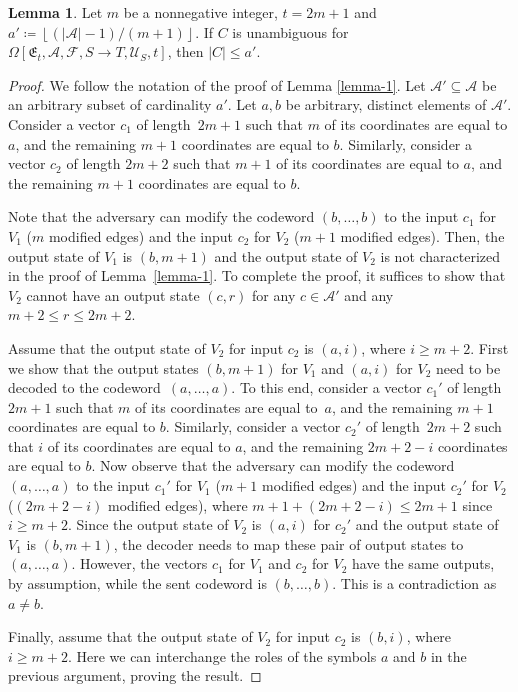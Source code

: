 \documentclass[11pt,a4paper]{article}
\theoremstyle{definition}
\newtheorem{lemma}[theorem]{Lemma}
\newcommand{\mA}{\mathcal{A}}
\newcommand{\mF}{\mathcal{F}}
\newcommand{\mU}{\mathcal{U}}
\begin{document}
\begin{lemma}
  \label{lemma0}
Let $m$ be a nonnegative integer, $t=2m+1$ and $a'\coloneqq\left\lfloor (|\mathcal{A}|-1)/(m+1)\right\rfloor$. If $C$ is unambiguous for $\Omega[\mathfrak{E}_t,\mA,\mF,S \to T,\mU_S,t]$, then $|C| \le a'$.
\end{lemma}
\begin{proof}
We follow the notation of the proof of Lemma \ref{lemma-1}. 
 Let $\mathcal{A}'\subseteq\mathcal{A}$ be an arbitrary subset of cardinality $a'$.
Let $a,b$ be arbitrary, distinct elements of $\mathcal{A}'$. 
Consider a vector $c_1$ of length~$2m+1$ such that $m$ of its coordinates are equal to $a$, and the remaining $m+1$ coordinates are equal to $b$. Similarly, consider a vector $c_2$ of length $2m+2$ such that $m+1$ of its coordinates are equal to $a$, and the remaining $m+1$ coordinates are equal to $b$. 

Note that the adversary can modify the codeword $(b,\dots,b)$ to the input $c_1$ for $V_1$ ($m$ modified edges) and the input $c_2$ for $V_2$ ($m+1$ modified edges). Then, the output state of $V_1$ is $(b,m+1)$ and the output state of $V_2$ is not characterized in the proof of Lemma~\ref{lemma-1}. To complete the proof, it suffices to show that $V_2$ cannot have an output state $(c,r)$ for any $c\in\mathcal{A'}$ and any $m+2\le r\le 2m+2$. 
  

Assume that the output state of $V_2$ for input $c_2$ is $(a,i)$, where $i\ge m+2$. First we show that the output states $(b,m+1)$ for $V_1$ and $(a,i)$ for $V_2$ need to be decoded to the codeword~$(a,\dots,a)$. To this end, consider a vector $c_1'$ of length $2m+1$ such that $m$ of its coordinates are equal to~$a$, and the remaining $m+1$ coordinates are equal to $b$. Similarly, consider a vector $c_2'$ of length~$2m+2$ such that $i$ of its coordinates are equal to $a$, and the remaining $2m+2-i$ coordinates are equal to $b$. Now observe that the adversary can modify the codeword $(a,\dots,a)$ to the input $c_1'$ for $V_1$ ($m+1$ modified edges) and the input $c_2'$ for $V_2$ ($(2m+2-i)$ modified edges), where $m+1+(2m+2-i)\le 2m+1$ since $i\ge m+2$. Since the output state of $V_2$ is $(a,i)$ for $c_2'$ and the output state of $V_1$ is $(b,m+1)$, the decoder needs to map these pair of output states to $(a,\dots,a)$. However, the vectors $c_1$ for $V_1$ and $c_2$ for $V_2$ have the same outputs, by assumption, while the sent codeword is $(b,\dots,b)$. This is a contradiction as $a \neq b$. 

Finally, assume that the output state of $V_2$ for input $c_2$ is $(b,i)$, where $i\ge m+2$. Here we can interchange the roles of the symbols $a$ and $b$ in the previous argument, proving the result. 
\end{proof}
\end{document}
